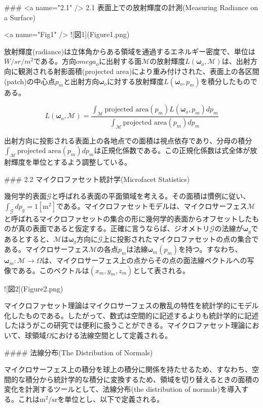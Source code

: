 ### <a name="2.1" /> 2.1 表面上での放射輝度の計測(Measuring Radiance on a Surface)

<a name="Fig1" /> ![図1](Figure1.png)

放射輝度(radiance)は立体角からある領域を通過するエネルギー密度で、単位は$W/sr/m^2$である。方向$omega_o$に出射する面$\mathcal M$の放射輝度$L(\boldsymbol{\omega}_o, \mathcal{M})$は、出射方向に観測される射影面積(projected area)により重み付けされた、表面上の各区間(patch)の中心点$p_m$と出射方向$\boldsymbol{\omega}_o$に対する放射輝度$L(\boldsymbol{\omega}_o, p_m)$を積分したものである。

\[
L(\boldsymbol{\omega}_o, \mathcal M) = \frac{\int_{\mathcal M} \text{projected area}(p_m) L(\boldsymbol{\omega}_o, p_m) dp_m}{\int_{\mathcal M} \text{projected area}(p_m) dp_m}
\label{eq:1} \tag{1}
\]

出射方向に投影される表面上の各地点での面積は視点依存であり、分母の積分$\int_{\mathcal M} \text{projected area}(p_m) dp_m$は正規化係数である。この正規化係数は式全体が放射輝度を単位とするよう調整している。

### 2.2 マイクロファセット統計学(Microfacet Statistics)

幾何学的表面$\mathcal G$と呼ばれる表面の平面領域を考える。その面積は慣例に従い、$\int_{\mathcal G}dp_g = 1 [\text{m}^2]$である。マイクロファセットモデルは、マイクロサーフェス$\mathcal M$と呼ばれるマイクロファセットの集合の形に幾何学的表面からオフセットしたものが真の表面であると仮定する。正確に言うならば、ジオメトリ$\mathcal G$の法線が$\boldsymbol{\omega}_g$であるとすると、$\mathcal M$は$\boldsymbol{\omega}_g$方向に$\mathcal G$上に投影されたマイクロファセットの点の集合である。マイクロサーフェス$\mathcal M$の各点$p_m$は法線$\boldsymbol{\omega}_m(p_m)$を持つ。すなわち、$\boldsymbol{\omega}_m : \mathcal{M} \rightarrow \Omega$は、マイクロサーフェス上の点からその点の面法線ベクトルへの写像である。このベクトルは$(x_m, y_m, z_m)$として表される。

![図2](Figure2.png)

マイクロファセット理論はマイクロサーフェスの散乱の特性を統計学的にモデル化したものである。したがって、数式は空間的に記述するよりも統計学的に記述したほうがこの研究では便利に扱うことができる。マイクロファセット理論において、球領域$\Omega$における法線空間として定義される。

#### 法線分布(The Distribution of Normals)

マイクロサーフェス上の積分を球上の積分に関係を持たせるため、すなわち、空間的な積分から統計学的な積分に変換するため、領域を切り替えるときの面積の変化を計測するツールとして、法線分布(the distribution of normals)を導入する。これは$\text{m}^2/\text{sr}$を単位とし、以下で定義される。

